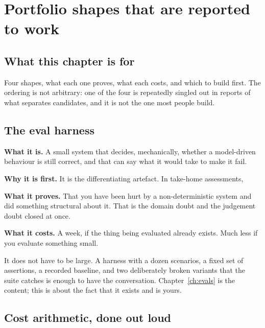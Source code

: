 \chapter{Portfolio shapes that are reported to work}
\label{ch:portfolio}

\section*{What this chapter is for}

Four shapes, what each one proves, what each costs, and which to build first.
The ordering is not arbitrary: one of the four is repeatedly singled out in
reports of what separates candidates, and it is not the one most people build.

\section{The eval harness}

\textbf{What it is.} A small system that decides, mechanically, whether a
model-driven behaviour is still correct, and that can say what it would take to
make it fail.

\textbf{Why it is first.} It is the differentiating artefact.  In take-home
assessments, 

\textbf{What it proves.} That you have been hurt by a non-deterministic system
and did something structural about it. That is the domain doubt and the
judgement doubt closed at once.

\textbf{What it costs.} A week, if the thing being evaluated already exists.
Much less if you evaluate something small.

\begin{kitnote}
It does not have to be large. A harness with a dozen scenarios, a fixed set of
assertions, a recorded baseline, and two deliberately broken variants that the
suite catches is enough to have the conversation. Chapter~\ref{ch:evals} is the
content; this is about the fact that it exists and is yours.
\end{kitnote}

\section{Cost arithmetic, done out loud}

